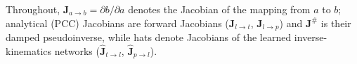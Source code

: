Throughout, $\mathbf{J}_{a \to b} = \partial b / \partial a$ denotes the Jacobian of the mapping from $a$ to $b$; analytical (PCC) Jacobians are forward Jacobians ($\mathbf{J}_{l \to t}$, $\mathbf{J}_{l \to p}$) and $\mathbf{J}^{\#}$ is their damped pseudoinverse, while hats denote Jacobians of the learned inverse-kinematics networks ($\hat{\mathbf{J}}_{t \to l}$, $\hat{\mathbf{J}}_{p \to l}$).
